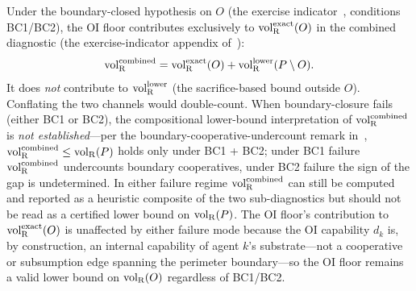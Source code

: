 \begin{remark}
Under the boundary-closed hypothesis on $O$
(the exercise indicator~\citep[Revealed~Sacrifice]{lasser2026paper8a}, conditions BC1/BC2),
the OI floor contributes exclusively to ${\operatorname{vol}_{\mathrm{R}}^{\mathrm{exact}}}(O)$ in the
combined diagnostic (the exercise-indicator appendix of~\citep[Revealed~Sacrifice]{lasser2026paper8a}):
\[
  {\operatorname{vol}_{\mathrm{R}}^{\mathrm{combined}}} = {\operatorname{vol}_{\mathrm{R}}^{\mathrm{exact}}}(O) + {\operatorname{vol}_{\mathrm{R}}^{\mathrm{lower}}}(P \setminus O).
\]
It does \emph{not} contribute to ${\operatorname{vol}_{\mathrm{R}}^{\mathrm{lower}}}$ (the
sacrifice-based bound outside $O$).  Conflating the two channels
would double-count.  When boundary-closure fails (either BC1 or BC2), the
compositional lower-bound interpretation of ${\operatorname{vol}_{\mathrm{R}}^{\mathrm{combined}}}$ is
\emph{not established}---per the boundary-cooperative-undercount
remark in~\citep[Revealed~Sacrifice]{lasser2026paper8a},
${\operatorname{vol}_{\mathrm{R}}^{\mathrm{combined}}} \leq {\operatorname{vol}_{\mathrm{R}}}(P)$ holds only under BC1 + BC2; under BC1
failure ${\operatorname{vol}_{\mathrm{R}}^{\mathrm{combined}}}$ undercounts boundary cooperatives, under BC2
failure the sign of the gap is undetermined.  In either failure
regime ${\operatorname{vol}_{\mathrm{R}}^{\mathrm{combined}}}$ can still be computed and reported as a
heuristic composite of the two sub-diagnostics but should not
be read as a certified lower bound on ${\operatorname{vol}_{\mathrm{R}}}(P)$.  The OI floor's
contribution to ${\operatorname{vol}_{\mathrm{R}}^{\mathrm{exact}}}(O)$ is unaffected by either failure
mode because the OI capability $d_k$ is, by construction,
an internal capability of agent $k$'s substrate---not a
cooperative or subsumption edge spanning the perimeter
boundary---so the OI floor remains a valid lower bound on
${\operatorname{vol}_{\mathrm{R}}}(O)$ regardless of BC1/BC2.
\end{remark}
